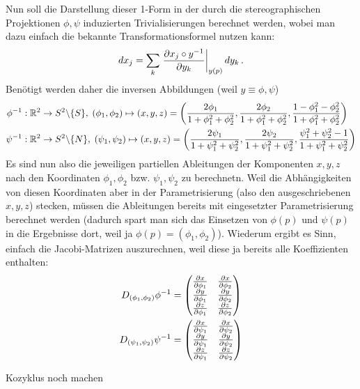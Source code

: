 \documentclass[../H_Analysis_main.tex]{subfiles}
\begin{document}
\begin{bsp}
Nun soll die Darstellung dieser 1-Form in der durch die stereographischen Projektionen $\phi, \psi$ induzierten Trivialisierungen berechnet werden, wobei man dazu einfach die bekannte Transformationsformel nutzen kann:
\begin{equation*}
dx_j = \sum_k \eval{\pdv{x_j \circ y^{-1}}{y_k}}_{y(p)} dy_k \, .
\end{equation*}
Benötigt werden daher die inversen Abbildungen (weil $y \equiv \phi, \psi$)
\begin{align*}
\phi^{-1}&: \mathbb{R}^2 \rightarrow S^2 \backslash \qty{S}, \; (\phi_1, \phi_2) \mapsto (x, y, z) = \qty(\frac{2 \phi_1}{1 + \phi_1^2 + \phi_2^2}, \frac{2 \phi_2}{1+ \phi_1^2 + \phi_2^2}, \frac{1 - \phi_1^2 - \phi_2^2}{1 + \phi_1^2 + \phi_2^2})
\\
\psi^{-1}&: \mathbb{R}^2 \rightarrow S^2 \backslash \qty{N}, \; (\psi_1, \psi_2) \mapsto (x, y, z) = \qty(\frac{2 \psi_1}{1 + \psi_1^2 + \psi_2^2}, \frac{2 \psi_2}{1+ \psi_1^2 + \psi_2^2}, \frac{\psi_1^2 + \psi_2^2 - 1}{1 + \psi_1^2 + \psi_2^2})
\end{align*}
Es sind nun also die jeweiligen partiellen Ableitungen der Komponenten $x, y, z$ nach den Koordinaten $\phi_1, \phi_2$ bzw. $\psi_1, \psi_2$ zu berechnetn. Weil die Abhängigkeiten von diesen Koordinaten aber in der Parametrisierung (also den ausgeschriebenen $x, y, z$) stecken, müssen die Ableitungen bereits mit eingesetzter Parametrisierung berechnet werden (dadurch spart man sich das Einsetzen von $\phi(p)$ und $\psi(p)$ in die Ergebnisse dort, weil ja $\phi(p) = (\phi_1, \phi_2)$). Wiederum ergibt es Sinn, einfach die Jacobi-Matrizen auszurechnen, weil diese ja bereits alle Koeffizienten enthalten:
\begin{align}
D_{(\phi_1, \phi_2)} \phi^{-1} &= \mqty(\pdv{x}{\phi_1} & \pdv{x}{\phi_2} \\ \pdv{y}{\phi_1} & \pdv{y}{\phi_2} \\ \pdv{z}{\phi_1} & \pdv{z}{\phi_2})
\\
D_{(\psi_1, \psi_2)} \psi^{-1} &= \mqty(\pdv{x}{\psi_1} & \pdv{x}{\psi_2} \\ \pdv{y}{\psi_1} & \pdv{y}{\psi_2} \\ \pdv{z}{\psi_1} & \pdv{z}{\psi_2})
\end{align}

Kozyklus noch machen

\end{bsp}
\end{document}
